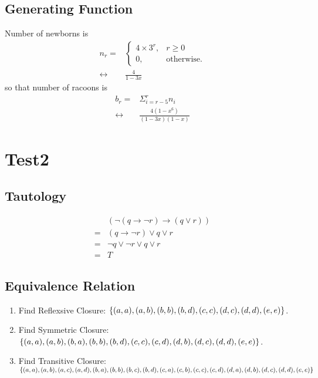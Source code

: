 \documentclass{../../cls/sig-alternate-05-2015}
\begin{document}
\subsection{Generating Function}
Number of newborns is \begin{align}
	n_r = & \begin{cases}
	4 \times 3^r, & r \ge 0\\
	0, & \text{otherwise}.
	\end{cases}\\
	\leftrightarrow & \frac{4}{1 - 3x}
\end{align} so that number of racoons is \begin{align}
	b_r = & \Sigma_{i = r - 5}^{r} n_i\\
	\leftrightarrow & \frac{4(1 - x^6)}{(1 - 3x)(1 - x)}
\end{align}

\clearpage

\section{Test2}
\subsection{Tautology}
\begin{align}
	& (\neg (q \rightarrow \neg r) \rightarrow (q \vee r))\\
	= & (q \rightarrow \neg r) \vee q \vee r\\
	= & \neg q \vee \neg r \vee q \vee r\\
	= & T
\end{align}

\subsection{Equivalence Relation}
\begin{enumerate}
	\item Find Reflexsive Closure: $\{(a, a), (a, b), (b, b), (b, d), \\(c, c), (d, c), (d, d), (e, e)\}$.
	\item Find Symmetric Closure: $\{(a, a), (a, b), (b, a), (b, b), \\(b, d), (c, c), (c, d), (d, b), (d, c), (d, d), (e, e)\}$.
	\item Find Transitive Closure: $\{(a, a), (a, b), (a, c), (a, d), \\(b, a), (b, b), (b, c), (b, d), (c, a), (c, b), (c, c), (c, d), (d, a), \\(d, b), (d, c), (d, d), (e, e)\}$
\end{enumerate}
\end{document}
